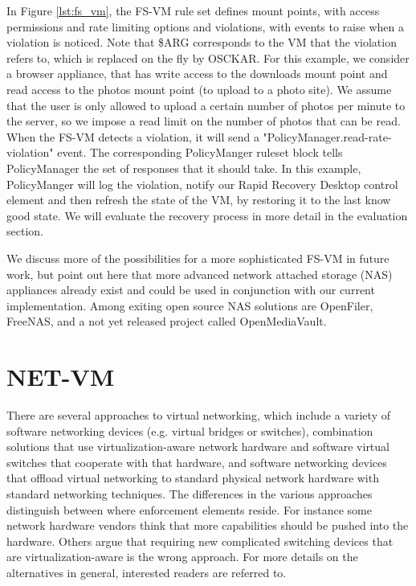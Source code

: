 In Figure \ref{lst:fs_vm}, the FS-VM rule set defines mount points, with access permissions and rate limiting options and violations, with events to raise when a violation is noticed. Note that \$ARG corresponds to the VM that the violation refers to, which is replaced on the fly by OSCKAR. For this example, we consider a browser appliance, that has write access to the downloads mount point and read access to the photos mount point (to upload to a photo site). We assume that the user is only allowed to upload a certain number of photos per minute to the server, so we impose a read limit on the number of photos that can be read. When the FS-VM detects a violation, it will send a "PolicyManager.read-rate-violation" event. The corresponding PolicyManger ruleset block tells PolicyManager the set of responses that it should take. In this example, PolicyManger will log the violation, notify our Rapid Recovery Desktop control element and then refresh the state of the VM, by restoring it to the last know good state. We will evaluate the recovery process in more detail in the evaluation section.

We discuss more of the possibilities for a more sophisticated FS-VM in future work, but point out here that more advanced network attached storage (NAS) appliances already exist and could be used in conjunction with our current implementation. Among exiting open source NAS solutions are OpenFiler\cite{openfiler_website}, FreeNAS\cite{freenas_website}, and a not yet released project called OpenMediaVault\cite{openmediavault_website}.

\section{NET-VM}
\label{sec:net-vm-implementation}

There are several approaches to virtual networking, which include a variety of software networking devices (e.g. virtual bridges or switches), combination solutions that use virtualization-aware network hardware and software virtual switches that cooperate with that hardware, and software networking devices that offload virtual networking to standard physical network hardware with standard networking techniques. The differences in the various approaches distinguish between where enforcement elements reside. For instance some network hardware vendors think that more capabilities should be pushed into the hardware. Others argue that requiring new complicated switching devices that are virtualization-aware is the wrong approach. For more details on the alternatives in general, interested readers are referred to\cite{ovs_hotnets_2009, casado_hotnets_2008, cisco_nexus_website, vepa_2008, vntag_2008, vmware_vNetwork_Distributed_Switch_website}.

